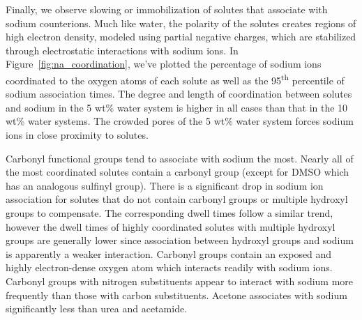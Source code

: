 \documentclass[journal=jpcbfk,manuscript=article]{achemso}
\begin{document}
  Finally, we observe slowing or immobilization of solutes that associate with
  sodium counterions. Much like water, the polarity of the solutes creates 
  regions of high electron density, modeled using partial negative charges, 
  which are stabilized through electrostatic interactions with sodium ions. 
  In Figure~\ref{fig:na_coordination}, we've plotted the percentage
  of sodium ions coordinated to the oxygen atoms of each solute as well as the
  95\textsuperscript{th} percentile of sodium association times. The degree and length of 
  coordination between solutes and sodium in the 5 wt\% water system is higher
  in all cases than that in the 10 wt\% water systems. The crowded pores of 
  the 5 wt\% water system forces sodium ions in close proximity to solutes. 
  
  Carbonyl functional groups tend to associate with sodium the most. Nearly
  all of the most coordinated solutes contain a carbonyl group (except for 
  DMSO which has an analogous sulfinyl group). There is a significant
  drop in sodium ion association for solutes that do not contain carbonyl 
  groups or multiple hydroxyl groups to compensate. The corresponding dwell
  times follow a similar trend, however the dwell times of highly coordinated 
  solutes with multiple hydroxyl groups are generally lower since association
  between hydroxyl groups and sodium is apparently a weaker interaction. Carbonyl
  groups contain an exposed and highly electron-dense oxygen atom which interacts
  readily with sodium ions. Carbonyl groups with nitrogen substituents appear
  to interact with sodium more frequently than those with carbon substituents. 
  Acetone associates with sodium significantly less than urea and acetamide. 

\end{document}

